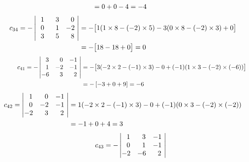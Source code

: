 \documentclass[12pt]{amsart}
\begin{document}
\begin{enumerate}
\begin{enumerate}
\begin{align}
				&=0+0-4=-4 \notag 
			\end{align}
			\begin{align}
			c_{34}=-
				\begin{vmatrix}
					\text{ } \text{ }1 &\text{ } \text{ }3 &\text{ } \text{ }0 \text{ } \\
					\text{ } \text{ }0 &\text{ } \text{ }1 &-2 \text{ } \\
					\text{ } \text{ }3 &\text{ } \text{ }5 &\text{ } \text{ }8 \text{ } \\
				\end{vmatrix}&=-\big[1(1\times8-(-2)\times5)-3(0\times8-(-2)\times3)+0\big] \notag \\
				&=-\big[18-18+0\big]=0 \notag
			\end{align}
			\begin{align}
			\hspace{1cm} c_{41}=-
				\begin{vmatrix}
					\text{ } \text{ }3 &\text{ } \text{ }0 &-1 \text{ } \\
					\text{ } \text{ }1 &-2 &-1 \text{ } \\
					-6 &\text{ } \text{ }3 &\text{ } \text{ }2 \text{ } \\
				\end{vmatrix}&=-\big[3(-2\times2-(-1)\times3)-0+(-1)(1\times3-(-2)\times(-6))\big] \notag \\
				&=-\left[-3+0+9\right]=-6 \notag
			\end{align}
			\begin{align}
			c_{42}=
				\begin{vmatrix}
					\text{ } \text{ }1 &\text{ } \text{ }0 &-1 \text{ } \\
					\text{ } \text{ }0 &-2 &-1 \text{ } \\
					-2 &\text{ } \text{ }3 &\text{ } \text{ }2 \text{ } \\
				\end{vmatrix}&=1(-2\times2-(-1)\times3)-0+(-1)(0\times3-(-2)\times(-2)) \notag \\
				&=-1+0+4=3 \notag
			\end{align}
			\begin{align}
			\hspace{0.8cm} c_{43}=-
				\begin{vmatrix}
					\text{ } \text{ }1 &\text{ } \text{ }3 &-1 \text{ } \\
					\text{ } \text{ }0 &\text{ } \text{ }1 &-1 \text{ } \\
					-2 &-6 &\text{ } \text{ }2 \text{ } \\

\end{vmatrix}
\end{align}
\end{enumerate}
\end{enumerate}
\end{document}
